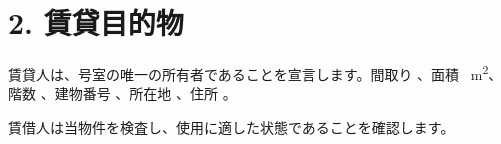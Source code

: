 \section*{2. 賃貸目的物}
賃貸人は、\Propunitnumber 号室の唯一の所有者であることを宣言します。間取り \Propdisposition、面積 \Propaream~m\textsuperscript{2}、階数 \Propfloor、建物番号 \Propbuildingnumber、所在地 \Propcadastralterritory、住所 \Propaddress 。

賃借人は当物件を検査し、使用に適した状態であることを確認します。
